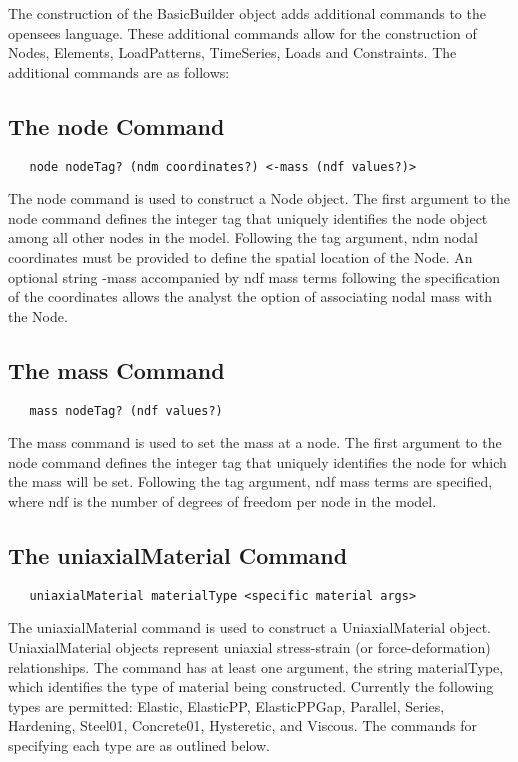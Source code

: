 \documentclass[12pt]{article}
\begin{document}
The construction of the BasicBuilder object adds additional commands
to the opensees language. These additional commands allow for the
construction of Nodes, Elements, LoadPatterns, TimeSeries, Loads and
Constraints. The additional commands are as follows:

\subsection{The node Command}
{\sf\small
\begin{verbatim}
   node nodeTag? (ndm coordinates?) <-mass (ndf values?)>
\end{verbatim}
}

The node command is used to construct a Node object. The first
argument to the node command defines the integer tag that uniquely
identifies the node object among all other nodes in the model. Following the tag
argument, ndm nodal coordinates must be provided to define the spatial
location of the Node. An optional string -mass accompanied by ndf
mass terms following the specification of the coordinates allows the
analyst the option of associating nodal mass with the Node.

\subsection{The mass Command}
{\sf\small
\begin{verbatim}
   mass nodeTag? (ndf values?)
\end{verbatim}
}

The mass command is used to set the mass at a node. The first
argument to the node command defines the integer tag that uniquely
identifies the node for which the mass will be set. Following the tag
argument, ndf mass terms are specified, where ndf is the number of
degrees of freedom per node in the model.

\subsection{The uniaxialMaterial Command}
{\sf\small
\begin{verbatim}
   uniaxialMaterial materialType <specific material args>
\end{verbatim}
}

The uniaxialMaterial command is used to construct a UniaxialMaterial object. 
UniaxialMaterial objects represent uniaxial stress-strain (or force-deformation)
relationships. The command has at least one argument, the string materialType, which
identifies the type of material being constructed. Currently the following types 
are permitted: Elastic, ElasticPP, ElasticPPGap, Parallel, Series, Hardening,
Steel01, Concrete01, Hysteretic, and Viscous. The commands for specifying each type are
as outlined below.
\end{document}

